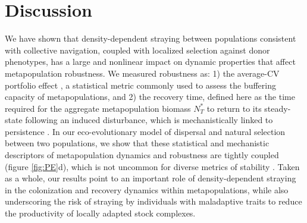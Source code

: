 \documentclass{revtex4}
\begin{document}
\section{Discussion}

We have shown that density-dependent straying between populations consistent with collective navigation, coupled with localized selection against donor phenotypes, has a large and nonlinear impact on dynamic properties that affect metapopulation robustness.
We measured robustness as:
1) the average-CV portfolio effect \citep{Anderson:2013gb,Anonymous:2015gf}, a statistical metric commonly used to assess the buffering capacity of metapopulations, and
2) the recovery time, defined here as the time required for the aggregate metapopulation biomass $N_T^*$ to return to its steady-state following an induced disturbance, which is mechanistically linked to persistence \citep{Ovaskainen:2002il}.
In our eco-evolutionary model of dispersal and natural selection between two populations, we show that these statistical and mechanistic descriptors of metapopulation dynamics and robustness are tightly coupled (figure \ref{fig:PE}d), which is not uncommon for diverse metrics of stability \citep{Donohue:2013iu}.
Taken as a whole, our results point to an important role of density-dependent straying in the colonization and recovery dynamics within metapopulations, while also underscoring the risk of straying by individuals with maladaptive traits to reduce the productivity of locally adapted stock complexes.

% 
% 
\end{document}
